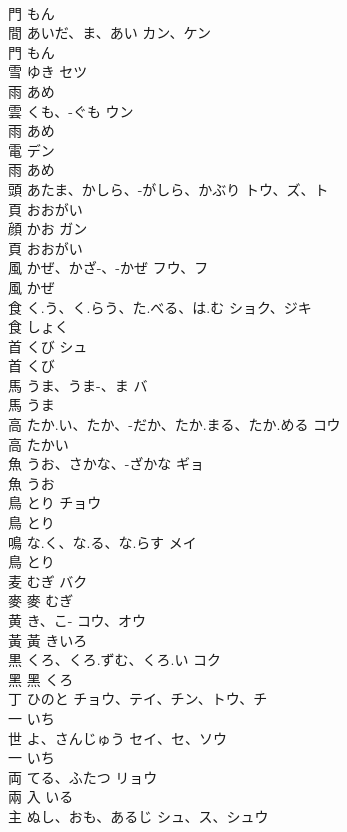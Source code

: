 \documentclass[8pt]{extreport}
\begin{document}
\begin{CJK}{UTF8}{min}
\\	門		もん		
\\	間	あいだ、ま、あい	カン、ケン	
\\	門		もん		
\\	雪	ゆき	セツ	
\\	雨		あめ		
\\	雲	くも、-ぐも	ウン	
\\	雨		あめ		
\\	電		デン	
\\	雨		あめ		
\\	頭	あたま、かしら、-がしら、かぶり	トウ、ズ、ト	
\\	頁		おおがい		
\\	顔	かお	ガン	
\\	頁		おおがい		
\\	風	かぜ、かざ-、-かぜ	フウ、フ	
\\	風		かぜ		
\\	食	く.う、く.らう、た.べる、は.む	ショク、ジキ	
\\	食		しょく		
\\	首	くび	シュ	
\\	首		くび		
\\	馬	うま、うま-、ま	バ	
\\	馬		うま		
\\	高	たか.い、たか、-だか、たか.まる、たか.める	コウ	
\\	高		たかい		
\\	魚	うお、さかな、-ざかな	ギョ	
\\	魚		うお		
\\	鳥	とり	チョウ	
\\	鳥		とり		
\\	鳴	な.く、な.る、な.らす	メイ	
\\	鳥		とり		
\\	麦	むぎ	バク	
\\	麥	麥		むぎ		
\\	黄	き、こ-	コウ、オウ	
\\	黃	黃		きいろ		
\\	黒	くろ、くろ.ずむ、くろ.い	コク	
\\	黑	黑		くろ		
\\	丁	ひのと	チョウ、テイ、チン、トウ、チ	
\\	一		いち		
\\	世	よ、さんじゅう	セイ、セ、ソウ	
\\	一		いち		
\\	両	てる、ふたつ	リョウ	
\\	兩	入		いる		
\\	主	ぬし、おも、あるじ	シュ、ス、シュウ	

\end{CJK}
\end{document}
